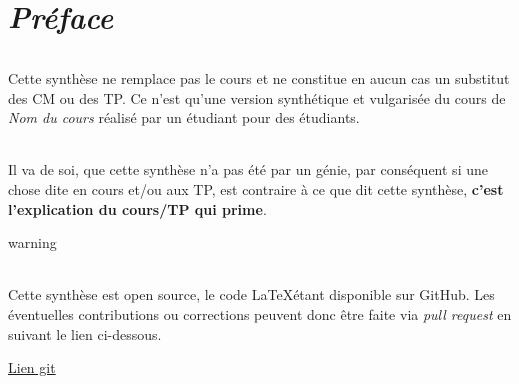 \chapter*{\textbf{\textit{Préface}}}
    
    \subparagraph{}Cette synthèse ne remplace pas le cours et ne constitue en aucun cas un substitut des CM ou des TP. Ce n'est qu'une version synthétique 
    et vulgarisée du cours de \textit{Nom du cours} réalisé par un étudiant pour des étudiants.

    \subparagraph{}Il va de soi, que cette synthèse n'a pas été par un génie, par conséquent si une chose dite en cours et/ou aux TP, est 
    contraire à ce que dit cette synthèse, \textbf{c’est l’explication du cours/TP qui prime}.

    \vfill
    \begin{tbox}{warning}
        \subparagraph{}Cette synthèse est open source, le code \LaTeX\;étant disponible sur GitHub. Les éventuelles contributions ou corrections peuvent
        donc être faite via \textit{pull request} en suivant le lien ci-dessous.
        \tcblower
        \begin{center}
            \href{Lien git}
            {Lien git}
        \end{center}
    \end{tbox}
    \vfill